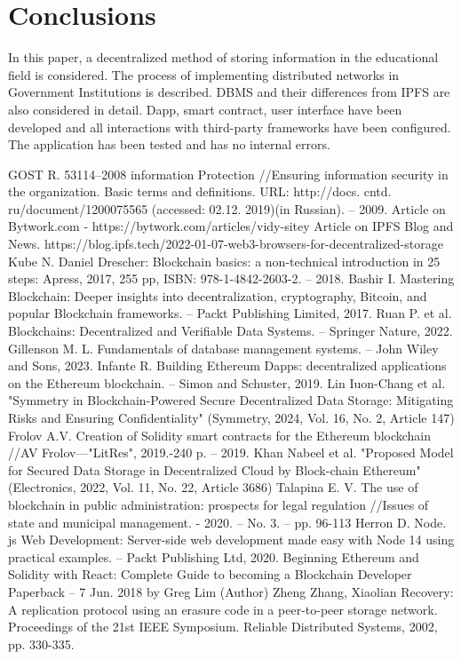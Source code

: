 \documentclass[10pt,conference,a4paper]{IEEEtran_EDM}
\begin{document}
\section{Conclusions }
In this paper, a decentralized method of storing information in the educational field is considered. The process of implementing distributed networks in Government Institutions is described. DBMS and their differences from IPFS are also considered in detail. Dapp, smart contract, user interface have been developed and all interactions with third-party frameworks have been configured. The application has been tested and has no internal errors.

\begin{thebibliography}{00}
 GOST R. 53114–2008 information Protection //Ensuring information security in the organization. Basic terms and definitions. URL: http://docs. cntd. ru/document/1200075565 (accessed: 02.12. 2019)(in Russian). – 2009.
 Article on Bytwork.com - https://bytwork.com/articles/vidy-sitey
 Article on IPFS Blog and News. https://blog.ipfs.tech/2022-01-07-web3-browsers-for-decentralized-storage
 Kube N. Daniel Drescher: Blockchain basics: a non-technical introduction in 25 steps: Apress, 2017, 255 pp, ISBN: 978-1-4842-2603-2. – 2018. 
 Bashir I. Mastering Blockchain: Deeper insights into decentralization, cryptography, Bitcoin, and popular Blockchain frameworks. – Packt Publishing Limited, 2017.
 Ruan P. et al. Blockchains: Decentralized and Verifiable Data Systems. – Springer Nature, 2022.
 Gillenson M. L. Fundamentals of database management systems. – John Wiley and Sons, 2023.
 Infante R. Building Ethereum Dapps: decentralized applications on the Ethereum blockchain. – Simon and Schuster, 2019.
 Lin Iuon-Chang et al. "Symmetry in Blockchain-Powered Secure Decentralized Data Storage: Mitigating Risks and Ensuring Confidentiality" (Symmetry, 2024, Vol. 16, No. 2, Article 147) 
 Frolov A.V. Creation of Solidity smart contracts for the Ethereum blockchain //AV Frolov—"LitRes", 2019.-240 p. – 2019.
 Khan Nabeel et al. "Proposed Model for Secured Data Storage in Decentralized Cloud by Block-chain Ethereum" (Electronics, 2022, Vol. 11, No. 22, Article 3686)  
 Talapina E. V. The use of blockchain in public administration: prospects for legal regulation //Issues of state and municipal management. - 2020. – No. 3. – pp. 96-113
 Herron D. Node. js Web Development: Server-side web development made easy with Node 14 using practical examples. – Packt Publishing Ltd, 2020.
 Beginning Ethereum and Solidity with React: Complete Guide to becoming a Blockchain Developer Paperback – 7 Jun. 2018 by Greg Lim (Author)
 Zheng Zhang, Xiaolian Recovery: A replication protocol using an erasure code in a peer-to-peer storage network. Proceedings of the 21st IEEE Symposium. Reliable Distributed Systems, 2002, pp. 330-335.

\end{thebibliography}
\end{document}
